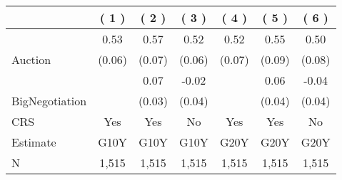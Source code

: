 
\begin{tabular}{lcccccc}
\toprule
 & ( 1 ) & ( 2 ) & ( 3 ) & ( 4 ) & ( 5 ) & ( 6 )\\
\midrule
 & 0.53 & 0.57 & 0.52 & 0.52 & 0.55 & 0.50\\

\multirow{-2}{*}{\raggedright\arraybackslash Auction} & (0.06) & (0.07) & (0.06) & (0.07) & (0.09) & (0.08)\\

 & \phantom{X} & 0.07 & -0.02 & \phantom{X} & 0.06 & -0.04\\

\multirow{-2}{*}{\raggedright\arraybackslash BigNegotiation} & \phantom{X} & (0.03) & (0.04) & \phantom{X} & (0.04) & (0.04)\\

\midrule
CRS & Yes & Yes & No & Yes & Yes & No\\

Estimate & G10Y & G10Y & G10Y & G20Y & G20Y & G20Y\\
\midrule

N & 1,515 & 1,515 & 1,515 & 1,515 & 1,515 & 1,515\\
\bottomrule
\end{tabular}

